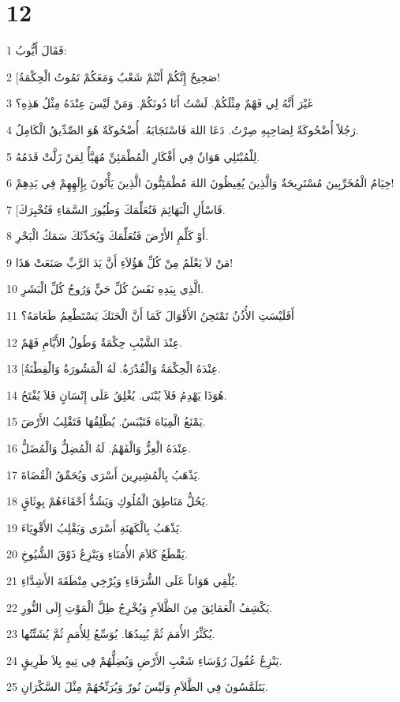 \chapter{12}

\par 1 فَقَالَ أَيُّوبُ:
\par 2 [صَحِيحٌ إِنَّكُمْ أَنْتُمْ شَعْبٌ وَمَعَكُمْ تَمُوتُ الْحِكْمَةُ!
\par 3 غَيْرَ أَنَّهُ لِي فَهْمٌ مِثْلَكُمْ. لَسْتُ أَنَا دُونَكُمْ. وَمَنْ لَيْسَ عِنْدَهُ مِثْلُ هَذِهِ؟
\par 4 رَجُلاً أُضْحُوكَةٌ لِصَاحِبِهِ صِرْتُ. دَعَا اللهَ فَاسْتَجَابَهُ. أُضْحُوكَةٌ هُوَ الصِّدِّيقُ الْكَامِلُ.
\par 5 لِلْمُبْتَلِي هَوَانٌ فِي أَفْكَارِ الْمُطْمَئِنِّ مُهَيَّأٌ لِمَنْ زَلَّتْ قَدَمُهُ.
\par 6 خِيَامُ الْمُخَرِّبِينَ مُسْتَرِيحَةٌ وَالَّذِينَ يُغِيظُونَ اللهَ مُطْمَئِنُّونَ الَّذِينَ يَأْتُونَ بِإِلَهِهِمْ فِي يَدِهِمْ!
\par 7 [فَاسْأَلِ الْبَهَائِمَ فَتُعَلِّمَكَ وَطُيُورَ السَّمَاءِ فَتُخْبِرَكَ.
\par 8 أَوْ كَلِّمِ الأَرْضَ فَتُعَلِّمَكَ وَيُحَدِّثَكَ سَمَكُ الْبَحْرِ.
\par 9 مَنْ لاَ يَعْلَمُ مِنْ كُلِّ هَؤُلاَءِ أَنَّ يَدَ الرَّبِّ صَنَعَتْ هَذَا!
\par 10 الَّذِي بِيَدِهِ نَفَسُ كُلِّ حَيٍّ وَرُوحُ كُلِّ الْبَشَرِ.
\par 11 أَفَلَيْسَتِ الأُذُنُ تَمْتَحِنُ الأَقْوَالَ كَمَا أَنَّ الْحَنَكَ يَسْتَطْعِمُ طَعَامَهُ؟
\par 12 عِنْدَ الشَّيْبِ حِكْمَةٌ وَطُولُ الأَيَّامِ فَهْمٌ.
\par 13 [عِنْدَهُ الْحِكْمَةُ وَالْقُدْرَةُ. لَهُ الْمَشُورَةُ وَالْفِطْنَةُ.
\par 14 هُوَذَا يَهْدِمُ فَلاَ يُبْنَى. يُغْلِقُ عَلَى إِنْسَانٍ فَلاَ يُفْتَحُ.
\par 15 يَمْنَعُ الْمِيَاهَ فَتَيْبَسُ. يُطْلِقُهَا فَتَقْلِبُ الأَرْضَ.
\par 16 عِنْدَهُ الْعِزُّ وَالْفَهْمُ. لَهُ الْمُضِلُّ وَالْمُضَلُّ.
\par 17 يَذْهَبُ بِالْمُشِيرِينَ أَسْرَى وَيُحَمِّقُ الْقُضَاةَ.
\par 18 يَحُلُّ مَنَاطِقَ الْمُلُوكِ وَيَشُدُّ أَحْقَاءَهُمْ بِوِثَاقٍ.
\par 19 يَذْهَبُ بِالْكَهَنَةِ أَسْرَى وَيَقْلِبُ الأَقْوِيَاءَ.
\par 20 يَقْطَعُ كَلاَمَ الأُمَنَاءِ وَيَنْزِعُ ذَوْقَ الشُّيُوخِ.
\par 21 يُلْقِي هَوَاناً عَلَى الشُّرَفَاءِ وَيُرْخِي مِنْطَقَةَ الأَشِدَّاءِ.
\par 22 يَكْشِفُ الْعَمَائِقَ مِنَ الظَّلاَمِ وَيُخْرِجُ ظِلَّ الْمَوْتِ إِلَى النُّورِ.
\par 23 يُكَثِّرُ الأُمَمَ ثُمَّ يُبِيدُهَا. يُوَسِّعُ لِلأُمَمِ ثُمَّ يُشَتِّتُها.
\par 24 يَنْزِعُ عُقُولَ رُؤَسَاءِ شَعْبِ الأَرْضِ وَيُضِلُّهُمْ فِي تِيهٍ بِلاَ طَرِيقٍ.
\par 25 يَتَلَمَّسُونَ فِي الظَّلاَمِ وَلَيْسَ نُورٌ وَيُرَنِّحُهُمْ مِثْلَ السَّكْرَانِ.

